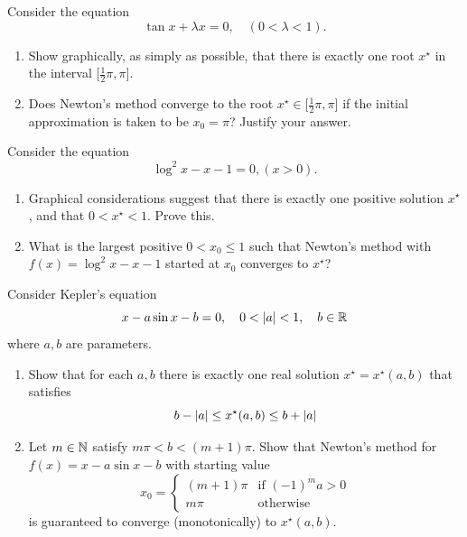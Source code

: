 \begin{problem}[Intermediate]\cite[p.251 \#16]{gautschi2011numerical}
Consider the equation 
\begin{equation*}
\tan x + \lambda x = 0, \quad (0 < \lambda < 1).
\end{equation*}
\begin{enumerate}
	\item Show graphically, as simply as possible, that there is exactly one root $x^\star$ in the interval $\big[ \frac{1}{2}\pi, \pi\big]$.
	\item Does Newton's method converge to the root $x^\star \in \big[ \frac{1}{2}\pi, \pi\big]$ if the initial approximation is taken to be $x_0 = \pi$?  Justify your answer.
\end{enumerate}
\end{problem}

\begin{problem}[Intermediate]\cite[p.252 \#17]{gautschi2011numerical}
Consider the equation 
\begin{equation*}
\log^2 x - x -1 = 0, (x > 0).
\end{equation*} 
\begin{enumerate}
	\item Graphical considerations suggest that there is exactly one positive solution $x^\star$, and that $0 <x^\star < 1$.  Prove this.
	\item What is the largest positive $0<x_0\leq 1$ such that Newton's method with $f(x) = \log^2 x - x -1 $ started at $x_0$ converges to $x^\star$?
\end{enumerate}
\end{problem}

\begin{problem}[Advanced]\cite[p.252 \#18]{gautschi2011numerical}
Consider Kepler's equation
\begin{equation*}
x -a \sin x - b = 0, \quad 0 <\lvert a \rvert<1, \quad b \in \mathbb{R}
\end{equation*}
where $a, b$ are parameters.
\begin{enumerate}
	\item Show that for each $a,b$ there is exactly one real solution $x^\star = x^\star(a,b)$ that satisfies
	\begin{equation*}
	b-\lvert a \rvert \leq x^\star(a,b) \leq b+\lvert a \rvert
	\end{equation*} 
	\item Let $m \in \mathbb{N}$ satisfy $m\pi < b < (m+1)\pi$.  Show that Newton's method for $f(x) = x -a \sin x - b$ with starting value
	\begin{equation*}
	x_0 = \begin{cases}
	(m+1)\pi &\text{if }(-1)^ma >0 \\
	m\pi &\text{otherwise}
	\end{cases}
	\end{equation*}
	is guaranteed to converge (monotonically) to $x^\star(a,b)$.
\end{enumerate}
\end{problem}

